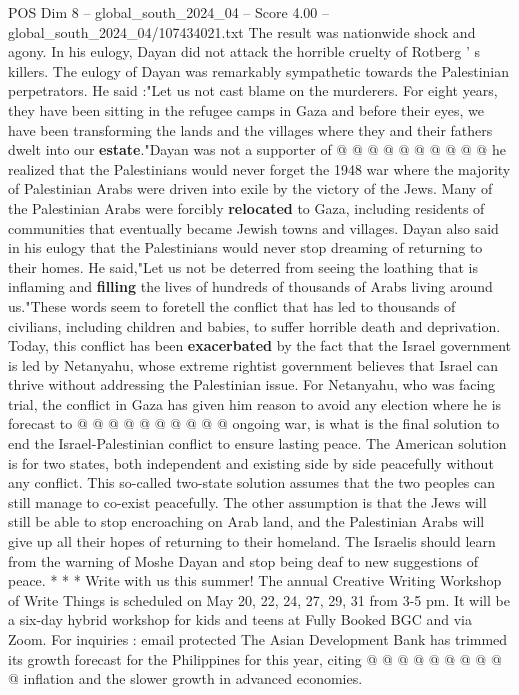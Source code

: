 \begin{textsample}{POS Dim 8 – global\_south\_2024\_04 – Score 4.00 – global\_south\_2024\_04/107434021.txt}
The result was nationwide shock and agony.
In his eulogy, Dayan did not attack the horrible cruelty of Rotberg ' s killers.
The eulogy of Dayan was remarkably sympathetic towards the Palestinian perpetrators.
He said :"Let us not cast blame on the murderers.
For eight years, they have been sitting in the refugee camps in Gaza and before their eyes, we have been transforming the lands and the villages where they and their fathers dwelt into our \textbf{estate}."Dayan was not a supporter of @ @ @ @ @ @ @ @ @ @ he realized that the Palestinians would never forget the 1948 war where the majority of Palestinian Arabs were driven into exile by the victory of the Jews.
Many of the Palestinian Arabs were forcibly \textbf{relocated} to Gaza, including residents of communities that eventually became Jewish towns and villages.
Dayan also said in his eulogy that the Palestinians would never stop dreaming of returning to their homes.
He said,"Let us not be deterred from seeing the loathing that is inflaming and \textbf{filling} the lives of hundreds of thousands of Arabs living around us."These words seem to foretell the conflict that has led to thousands of civilians, including children and babies, to suffer horrible death and deprivation.
Today, this conflict has been \textbf{exacerbated} by the fact that the Israel government is led by Netanyahu, whose extreme rightist government believes that Israel can thrive without addressing the Palestinian issue.
For Netanyahu, who was facing trial, the conflict in Gaza has given him reason to avoid any election where he is forecast to @ @ @ @ @ @ @ @ @ @ ongoing war, is what is the final solution to end the Israel-Palestinian conflict to ensure lasting peace.
The American solution is for two states, both independent and existing side by side peacefully without any conflict.
This so-called two-state solution assumes that the two peoples can still manage to co-exist peacefully.
The other assumption is that the Jews will still be able to stop encroaching on Arab land, and the Palestinian Arabs will give up all their hopes of returning to their homeland.
The Israelis should learn from the warning of Moshe Dayan and stop being deaf to new suggestions of peace. * * * Write with us this summer!
The annual Creative Writing Workshop of Write Things is scheduled on May 20, 22, 24, 27, 29, 31 from 3-5 pm.
It will be a six-day hybrid workshop for kids and teens at Fully Booked BGC and via Zoom.
For inquiries : email protected The Asian Development Bank has trimmed its growth forecast for the Philippines for this year, citing @ @ @ @ @ @ @ @ @ @ inflation and the slower growth in advanced economies.

\end{textsample}
